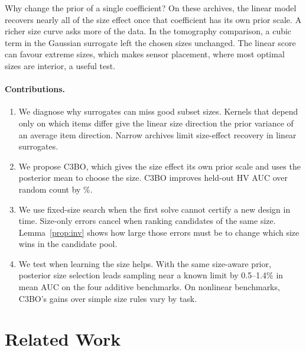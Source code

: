 \documentclass{article}
\newcommand{\revtext}[1]{{\color{blue}#1}}
\theoremstyle{remark}\newtheorem{remark}[proposition]{Remark}
\begin{document}
\revtext{Why change the prior of a single coefficient? On these archives, the linear model recovers nearly all of the size effect once that coefficient has its own prior scale. A richer size curve asks more of the data. In the tomography comparison, a cubic term in the Gaussian surrogate left the chosen sizes unchanged. The linear score can favour extreme sizes, which makes sensor placement, where most optimal sizes are interior, a useful test.}

\paragraph{Contributions.}
\begin{enumerate}[leftmargin=*,topsep=2pt,itemsep=1pt]
\item \revtext{We diagnose why surrogates can miss good subset sizes. Kernels that depend only on which items differ give the linear size direction the prior variance of an average item direction. Narrow archives limit size-effect recovery in linear surrogates.}
\item \revtext{We propose C3BO, which gives the size effect its own prior scale and uses the posterior mean to choose the size. C3BO improves held-out HV AUC over random count by \hvGainHeldIsh\%.}
\item \revtext{We use fixed-size search when the first solve cannot certify a new design in time. Size-only errors cancel when ranking candidates of the same size. Lemma~\ref{prop:inv} shows how large those errors must be to change which size wins in the candidate pool.}
\item \revtext{We test when learning the size helps. With the same size-aware prior, posterior size selection leads sampling near a known limit by 0.5--1.4\% in mean AUC on the four additive benchmarks. On nonlinear benchmarks, C3BO's gains over simple size rules vary by task.}
\end{enumerate}

\section{Related Work}\label{sec:related}
\end{document}
